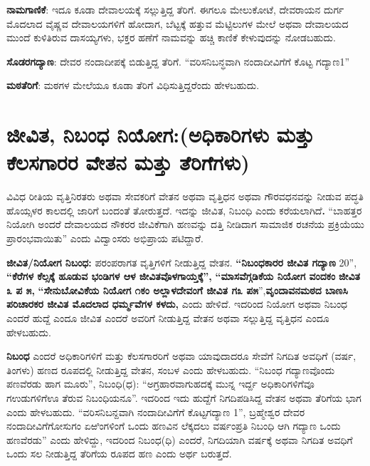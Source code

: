 \textbf{ನಾಮಗಾಣಿಕೆ}: ಇದೂ ಕೂಡಾ ದೇವಾಲಯಕ್ಕೆ ಸಲ್ಲುತ್ತಿದ್ದ ತೆರಿಗೆ. ಈಗಲೂ ಮೇಲುಕೋಟೆ, ದೇವರಾಯನ ದುರ್ಗ ಮೊದಲಾದ ವೈಷ್ಣವ ದೇವಾಲಯಗಳಿಗೆ ಹೋದಾಗ, ಬೆಟ್ಟಕ್ಕೆ ಹತ್ತುವ ಮೆಟ್ಟಿಲುಗಳ ಮೇಲೆ ಅಥವಾ ದೇವಾಲಯದ ಮುಂದೆ ಕುಳಿತಿರುವ ದಾಸಯ್ಯಗಳು, ಭಕ್ತರ ಹಣೆಗೆ ನಾಮವನ್ನು ಹಚ್ಚಿ ಕಾಣಿಕೆ ಕೇಳುವುದನ್ನು ನೋಡಬಹುದು.

\textbf{ಸೊಡರಗದ್ಯಾಣ}: ದೇವರ ನಂದಾದೀಪಕ್ಕೆ ಬಿಡುತ್ತಿದ್ದ ತೆರಿಗೆ. “ವರಿಸನಿಬನ್ಧವಾಗಿ ನಂದಾದೀವಿಗೆಗೆ ಕೊಟ್ಟ ಗದ್ಯಾಣ1”

\textbf{ಮಠತೆರಿಗೆ}: ಮಠಗಳ ಮೇಲೆಯೂ ಕೂಡಾ ತೆರಿಗೆ ವಿಧಿಸುತ್ತಿದ್ದರೆಂದು ಹೇಳಬಹುದು.

\section{ಜೀವಿತ, ನಿಬಂಧ ನಿಯೋಗ:(ಅಧಿಕಾರಿಗಳು ಮತ್ತು ಕೆಲಸಗಾರರ ವೇತನ ಮತ್ತು ತೆರಿಗೆಗಳು)}

ವಿವಿಧ ರೀತಿಯ ವೃತ್ತಿನಿರತರು ಅಥವಾ ಸೇವಕರಿಗೆ ವೇತನ ಅಥವಾ ವೃತ್ತಿಧನ ಅಥವಾ ಗೌರವಧನವನ್ನು ನೀಡುವ ಪದ್ಧತಿ ಹೊಯ್ಸಳರ ಕಾಲದಲ್ಲಿ ಜಾರಿಗೆ ಬಂದಂತೆ ತೋರುತ್ತದೆ. ಇದನ್ನು ಜೀವಿತ, ನಿಬಂಧಿ ಎಂದು ಕರೆಯಲಾಗಿದೆ\textbf{. }“ಬಾಹತ್ತರ ನಿಯೋಗಿ ಅಂದರೆ ದೇವಾಲಯದ ನೌಕರರ ಜೀವಿಕೆಗಾಗಿ ಹಣವನ್ನು ದತ್ತಿ ನೀಡಿದಾಗ ಸಾಮಾಜಿಕ ರಚನೆಯ ಪ್ರಕ್ರಿಯೆಯು ಪ್ರಾರಂಭವಾಯಿತು” ಎಂದು ವಿದ್ವಾಂಸರು ಅಭಿಪ್ರಾಯ ಪಟಿದ್ದಾರೆ.

\textbf{ಜೀವಿತ/ನಿಯೋಗ ನಿಬಂಧ:} ಪರಂಪರಾಗತ ವೃತ್ತಿಗಳಿಗೆ ನೀಡುತ್ತಿದ್ದ ವೇತನ. \textbf{“ನಿಬಂಧಕಾರರ ಜೀವಿತ ಗದ್ಯಾಣ} 20”,\textbf{ “ಕೆರೆಗಳ ಕೆಲ್ಸಕ್ಕೆ ಹೂಡುವ ಭಂಡಿಗಳ ಆಳ ಜೀವಿತವೊಳಗಾಯ್ತಕ್ಕೆ”,}\textbf{ “ಮಾಸವೆಗ್ಗಡಿಕೆಯ ನಿಯೋಗ ವಂದಕಂ} \textbf{ಜೀವಿತ ೩ ಪ ೫,}\textbf{ “ಸೇನುಬೋವಿಕೆಯ ನಿಯೋಗ ೧ಕಂ ಅಲ್ಲಾಳದೇವಂಗೆ ಜೀವಿತ ಗ೩ ಪ೫}”,\textbf{ವೃಂದಾವನಮಠದ ಬಾಣಸಿ ಪರಿಚಾರಕರ ಜೀವಿತ ಮೊದಲಾದ ಧರ್ಮ್ಮವೆಗಳ ಕಳದು,} ಎಂದು ಹೇಳಿದೆ. ಇದರಿಂದ ನಿಯೋಗ ಅಥವಾ ನಿಬಂಧ ಎಂದರೆ ಹುದ್ದೆ ಎಂದೂ ಜೀವಿತ ಎಂದರೆ ಅವರಿಗೆ ನೀಡುತ್ತಿದ್ದ ವೇತನ ಅಥವಾ ಸಲ್ಲುತ್ತಿದ್ದ ವೃತ್ತಿಧನ ಎಂದೂ ಹೇಳಬಹುದು.

\textbf{ನಿಬಂಧ} ಎಂದರೆ ಅಧಿಕಾರಿಗಳಿಗೆ ಮತ್ತು ಕೆಲಸಗಾರರಿಗೆ ಅಥವಾ ಯಾವುದಾದರೂ ಸೇವೆಗೆ ನಿಗದಿತ ಅವಧಿಗೆ (ವರ್ಷ, ತಿಂಗಳು) ಹಣದ ರೂಪದಲ್ಲಿ ನೀಡುತ್ತಿದ್ದ ವೇತನ, ಸಂಬಳ ಎಂದು ಹೇಳಬಹುದು. “ನಿಬಂಧ ಗದ್ಯಾಣವೊಂದು ಪಣವೆರಡು ಹಾಗ ಮೂರು”, ನಿಬಂಧಿ(ಧ): “ಅಗ್ರಹಾರವಾಗುಹದಕ್ಕೆ ಮುನ್ನ ಇರ್ದ್ದ ಅಧಿಕಾರಿಗಳಿಗೆವೂ ಗಉಡುಗಳಿಗೆಊ ತೆರುವ ನಿಬಂಧಿಯನೂ”. ಇದರಿಂದ ಇದು ಹುದ್ದೆಗೆ ನಿಗದಿಪಡಿಸಿದ್ದ ವೇತನ ಅಥವಾ ತೆರಿಗೆಯ ಭಾಗ ಎಂದು ಹೇಳಬಹುದು. “ವರಿಸನಿಬನ್ದವಾಗಿ ನಂದಾದೀವಿಗೆಗೆ ಕೊಟ್ಟಗದ್ಯಾಣ 1”, ಬ್ರಹ್ಮೇಶ್ವರ ದೇವರ ನಂದಾದೀವಿಗೆಗೋಸುಗಂ ಏಱಿಂಗಳಿಂಗೆ ಒಂದು ಹಣವಿನ ಲೆಕ್ಕದಲು ವರ್ಷಂಪ್ರತಿ ನಿಬಂಧಿ ಆಗಿ ಗದ್ಯಾಣ ಒಂದು ಹಣವೆರಡು” ಎಂದು ಹೇಳಿದ್ದು, ಇದರಿಂದ ನಿಬಂಧ(ಧಿ) ಎಂದರೆ, ನಿಗದಿಯಾಗಿ ವರ್ಷಕ್ಕೆ ಅಥವಾ ನಿಗದಿತ ಅವಧಿಗೆ ಒಂದು ಸಲ ನೀಡುತ್ತಿದ್ದ ತೆರಿಗೆಯ ರೂಪದ ಹಣ ಎಂದು ಅರ್ಥ ಬರುತ್ತದೆ.

